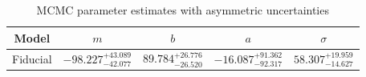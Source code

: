\begin{table}[htbp]
\centering
\begin{tabular}{|c|c|c|c|c|}
\hline
Model & $m$ & $b$ & $a$ & $\sigma$ \\
\hline
Fiducial & $-98.227^{+43.089}_{-42.077}$ & $89.784^{+26.776}_{-26.520}$ & $-16.087^{+91.362}_{-92.317}$ & $58.307^{+19.959}_{-14.627}$ \\
\hline
\end{tabular}
\caption{MCMC parameter estimates with asymmetric uncertainties}
\label{tab:params}
\end{table}
